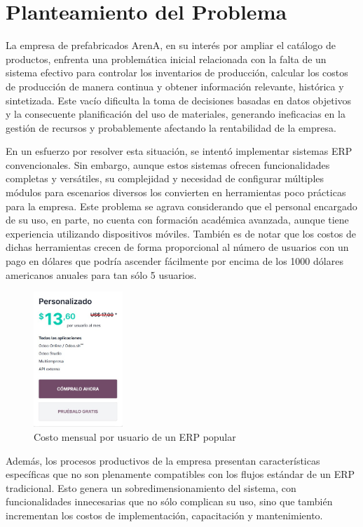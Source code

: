 \section{Planteamiento del Problema} \label{problem_statement}

La empresa de prefabricados ArenA, en su interés por ampliar el catálogo de productos, enfrenta una problemática inicial relacionada con la falta de un sistema efectivo para controlar los inventarios de producción, calcular los costos de producción de manera continua y obtener información relevante, histórica y sintetizada.
Este vacío dificulta la toma de decisiones basadas en datos objetivos y la consecuente planificación del uso de materiales, generando ineficacias en la gestión de recursos y probablemente afectando la rentabilidad de la empresa.

En un esfuerzo por resolver esta situación, se intentó implementar sistemas ERP convencionales. Sin embargo, aunque estos sistemas ofrecen funcionalidades completas y versátiles, su complejidad y necesidad de configurar múltiples módulos para escenarios diversos los convierten en herramientas poco prácticas para la empresa.
Este problema se agrava considerando que el personal encargado de su uso, en parte, no cuenta con formación académica avanzada, aunque tiene experiencia utilizando dispositivos móviles.
También es de notar que los costos de dichas herramientas crecen de forma proporcional al número de usuarios con un pago en dólares que podría ascender fácilmente por encima de los 1000 dólares americanos anuales para tan sólo 5 usuarios.

\begin{figure}[htbp]
  \centering
  \includegraphics[width=0.3\textwidth]{assets/oddopricing.JPG}
  \caption{Costo mensual por usuario de un ERP popular}
  \label{fig:oddopricing}
\end{figure}

Además, los procesos productivos de la empresa presentan características específicas que no son plenamente compatibles con los flujos estándar de un ERP tradicional.
Esto genera un sobredimensionamiento del sistema, con funcionalidades innecesarias que no sólo complican su uso, sino que también incrementan los costos de implementación, capacitación y mantenimiento.


